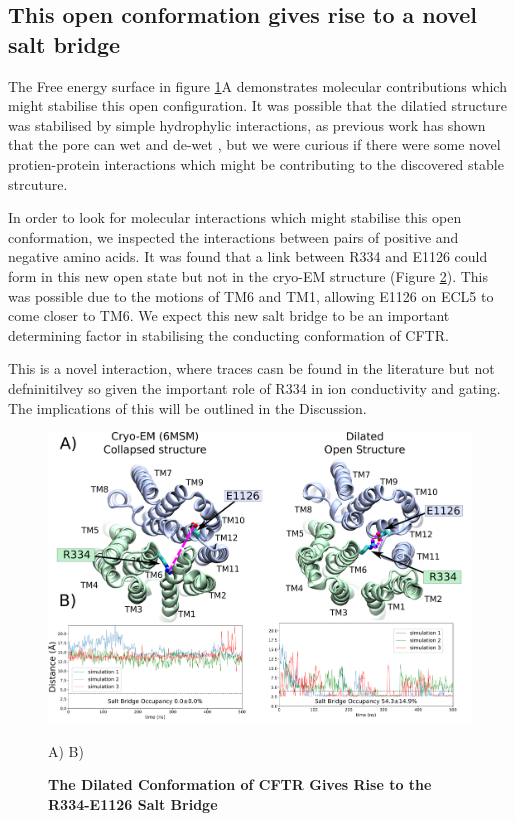 \begin{figure}
	\label{summary_FES}
\end{figure}


\subsection{This open conformation gives rise to a novel salt bridge}
\label{salt_bridge}
The Free energy surface in figure \ref{summary_FES}A demonstrates molecular contributions which might stabilise this open configuration. It was possible that the dilatied structure was stabilised by simple hydrophylic interactions, as previous work has shown that the pore can wet and de-wet \cite{}, but we were curious if there were some novel protien-protein interactions which might be contributing to the discovered stable strcuture. 

In order to look for molecular interactions which might stabilise this open conformation, we inspected the interactions between pairs of positive and negative amino acids. It was found that a link between R334 and  E1126 could form in this new open state but not in the cryo-EM structure (Figure \ref{salt_bridge_fig}). This was possible due to the motions of TM6 and TM1, allowing E1126 on ECL5 to come closer to TM6. We expect this new salt bridge to be an important determining factor in stabilising the conducting conformation of CFTR.  

This is a novel interaction, where traces casn be found in the literature but not defninitilvey so given the important role of R334 in ion conductivity and gating. The implications of this will be outlined in the Discussion.

\begin{figure}
	\label{salt_bridge_fig}
	\begin{center}
		\includegraphics[width=1\textwidth]{figures/opening/salt_bridge_E1126_R334_figure.pdf}
	\end{center}
	\captionsetup{singlelinecheck = false, justification=raggedright}
	\caption[The Dilated Conformation of CFTR Gives Rise to the R334-E1126 Salt Bridge] {\textbf{The Dilated Conformation of CFTR Gives Rise to the R334-E1126 Salt Bridge}}{A) B) }
\end{figure}

